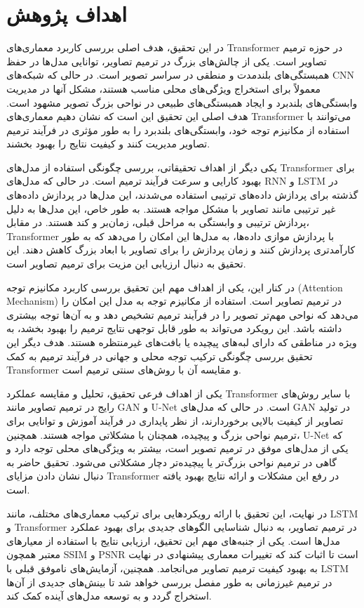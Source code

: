 \section{اهداف پژوهش}

در این تحقیق، هدف اصلی بررسی کاربرد معماری‌های Transformer در حوزه ترمیم تصاویر است. یکی از چالش‌های بزرگ در ترمیم تصاویر، توانایی مدل‌ها در حفظ همبستگی‌های بلندمدت و منطقی در سراسر تصویر است. در حالی که شبکه‌های CNN معمولاً برای استخراج ویژگی‌های محلی مناسب هستند، مشکل آنها در مدیریت وابستگی‌های بلندبرد و ایجاد همبستگی‌های طبیعی در نواحی بزرگ تصویر مشهود است. هدف اصلی این تحقیق این است که نشان دهیم معماری‌های Transformer می‌توانند با استفاده از مکانیزم توجه خود، وابستگی‌های بلندبرد را به طور مؤثری در فرآیند ترمیم تصاویر مدیریت کنند و کیفیت نتایج را بهبود بخشند.

یکی دیگر از اهداف تحقیقاتی، بررسی چگونگی استفاده از مدل‌های Transformer برای بهبود کارایی و سرعت فرآیند ترمیم است. در حالی که مدل‌های RNN و LSTM در گذشته برای پردازش داده‌های ترتیبی استفاده می‌شدند، این مدل‌ها در پردازش داده‌های غیر ترتیبی مانند تصاویر با مشکل مواجه هستند. به طور خاص، این مدل‌ها به دلیل پردازش ترتیبی و وابستگی به مراحل قبلی، زمان‌بر و کند هستند. در مقابل، Transformer با پردازش موازی داده‌ها، به مدل‌ها این امکان را می‌دهد که به طور کارآمدتری پردازش کنند و زمان پردازش را برای تصاویر با ابعاد بزرگ کاهش دهند. این تحقیق به دنبال ارزیابی این مزیت برای ترمیم تصاویر است.

در کنار این، یکی از اهداف مهم این تحقیق بررسی کاربرد مکانیزم توجه (Attention Mechanism) در ترمیم تصاویر است. استفاده از مکانیزم توجه به مدل این امکان را می‌دهد که نواحی مهم‌تر تصویر را در فرآیند ترمیم تشخیص دهد و به آن‌ها توجه بیشتری داشته باشد. این رویکرد می‌تواند به طور قابل توجهی نتایج ترمیم را بهبود بخشد، به ویژه در مناطقی که دارای لبه‌های پیچیده یا بافت‌های غیرمنتظره هستند. هدف دیگر این تحقیق بررسی چگونگی ترکیب توجه محلی و جهانی در فرآیند ترمیم به کمک Transformer و مقایسه آن با روش‌های سنتی ترمیم است.

یکی از اهداف فرعی تحقیق، تحلیل و مقایسه عملکرد Transformer با سایر روش‌های رایج در ترمیم تصاویر مانند GAN و U-Net است. در حالی که مدل‌های GAN در تولید تصاویر از کیفیت بالایی برخوردارند، از نظر پایداری در فرآیند آموزش و توانایی برای ترمیم نواحی بزرگ و پیچیده، همچنان با مشکلاتی مواجه هستند. همچنین، U-Net که یکی از مدل‌های موفق در ترمیم تصویر است، بیشتر به ویژگی‌های محلی توجه دارد و گاهی در ترمیم نواحی بزرگ‌تر یا پیچیده‌تر دچار مشکلاتی می‌شود. تحقیق حاضر به دنبال نشان دادن مزایای Transformer در رفع این مشکلات و ارائه نتایج بهبود یافته است.

در نهایت، این تحقیق با ارائه رویکردهایی برای ترکیب معماری‌های مختلف، مانند LSTM و Transformer در ترمیم تصاویر، به دنبال شناسایی الگوهای جدیدی برای بهبود عملکرد مدل‌ها است. یکی از جنبه‌های مهم این تحقیق، ارزیابی نتایج با استفاده از معیارهای معتبر همچون SSIM و PSNR است تا اثبات کند که تغییرات معماری پیشنهادی در نهایت به بهبود کیفیت ترمیم تصاویر می‌انجامد. همچنین، آزمایش‌های ناموفق قبلی با LSTM در ترمیم غیرزمانی به طور مفصل بررسی خواهد شد تا بینش‌های جدیدی از آن‌ها استخراج گردد و به توسعه مدل‌های آینده کمک کند.



